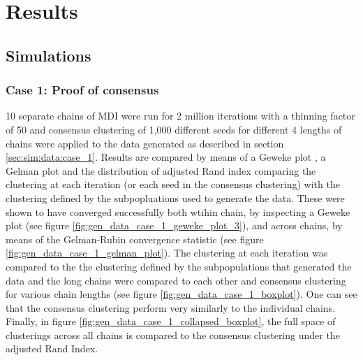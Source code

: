 \documentclass[12pt]{article} %
\begin{document}
	

	
	\section{Results}
	\subsection{Simulations}
	\subsubsection{Case 1: Proof of consensus} \label{sec:results:case_1}
	10 separate chains of MDI were run for 2 million iterations with a thinning factor of 50 and consensus clustering of 1,000 different seeds for different 4 lengths of chains were applied to the data generated as described in section \ref{sec:sim:data:case_1}. Results are compared by means of a Geweke plot \cite{GewekeEvaluatingAccuracySamplingBased}, a Gelman plot \cite{GelmanInferenceIterativeSimulation1992} and the distribution of adjusted Rand index comparing the clustering at each iteration (or each seed in the consensus clustering) with the clustering defined by the subpopluations used to generate the data. These were shown to have converged successfully both wtihin chain, by inspecting a Geweke plot (see figure \ref{fig:gen_data_case_1_geweke_plot_3}), and across chains, by means of the Gelman-Rubin convergence statistic (see figure \ref{fig:gen_data_case_1_gelman_plot}). The clustering at each iteration was compared to the the clustering defined by the subpopulations that generated the data and the long chains were compared to each other and consensus clustering for various chain lengths (see figure \ref{fig:gen_data_case_1_boxplot}). One can see that the consensus clustering perform very similarly to the individual chains. Finally, in figure \ref{fig:gen_data_case_1_collapsed_boxplot}, the full space of clusterings across all chains is compared to the consensus clustering under the adjusted Rand Index.
\end{document}
